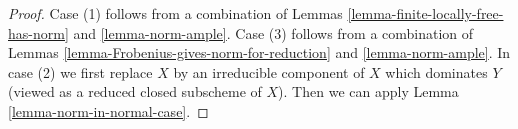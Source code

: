 \documentclass[10pt,a4paper]{amsart}
\theoremstyle{plain}
\theoremstyle{definition}
\theoremstyle{remark}
\numberwithin{equation}{subsection}
\begin{document}
\begin{proof}
Case (1) follows from a combination of
Lemmas \ref{lemma-finite-locally-free-has-norm} and \ref{lemma-norm-ample}.
Case (3) follows from a combination of
Lemmas \ref{lemma-Frobenius-gives-norm-for-reduction} and
\ref{lemma-norm-ample}.
In case (2) we first replace $X$ by an irreducible component of $X$
which dominates $Y$ (viewed as a reduced closed subscheme of $X$).
Then we can apply Lemma \ref{lemma-norm-in-normal-case}.
\end{proof}
\end{document}
